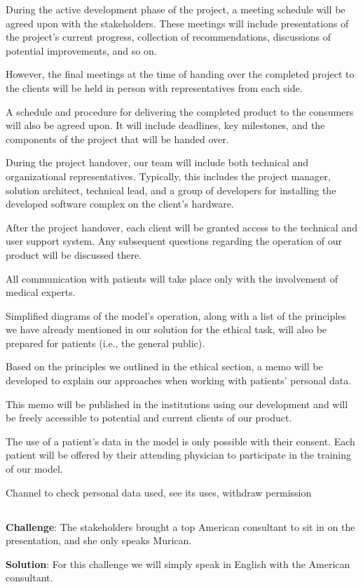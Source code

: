 During the active development phase of the project, a meeting schedule will be agreed upon with the stakeholders.
These meetings will include presentations of the project's current progress, collection of recommendations, discussions of potential improvements, and so on.

However, the final meetings at the time of handing over the completed project to the clients will be held in person with representatives from each side.

A schedule and procedure for delivering the completed product to the consumers will also be agreed upon.
It will include deadlines, key milestones, and the components of the project that will be handed over.

During the project handover, our team will include both technical and organizational representatives.
Typically, this includes the project manager, solution architect, technical lead, and a group of developers for installing the developed software complex on the client's hardware.

After the project handover, each client will be granted access to the technical and user support system.
Any subsequent questions regarding the operation of our product will be discussed there.

All communication with patients will take place only with the involvement of medical experts.

Simplified diagrams of the model's operation, along with a list of the principles we have already mentioned in our solution for the ethical task, will also be prepared for patients (i.e., the general public).

Based on the principles we outlined in the ethical section, a memo will be developed to explain our approaches when working with patients' personal data.

This memo will be published in the institutions using our development and will be freely accessible to potential and current clients of our product.

The use of a patient's data in the model is only possible with their consent.
Each patient will be offered by their attending physician to participate in the training of our model.

Channel to check personal data used, see its uses, withdraw permission

\subsection*{}
\begin{warning}
    \textbf{Challenge}: The stakeholders brought a top American consultant to sit in on the presentation, and she only speaks Murican.

    \textbf{Solution}: For this challenge we will simply speak in English with the American consultant.



\end{warning}





